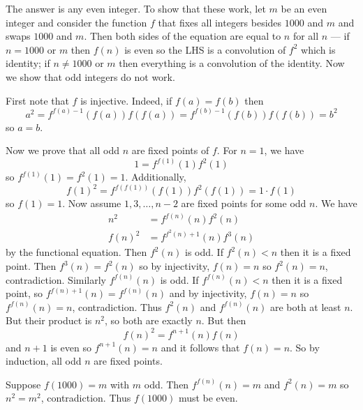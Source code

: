 The answer is any even integer. To show that these work, let $m$ be an even integer and consider the function $f$ that fixes all integers besides $1000$ and $m$ and swaps $1000$ and $m$. Then both sides of the equation are equal to $n$ for all $n$ --- if $n=1000$ or $m$ then $f(n)$ is even so the LHS is a convolution of $f^2$ which is identity; if $n\neq1000$ or $m$ then everything is a convolution of the identity. Now we show that odd integers do not work.

First note that $f$ is injective. Indeed, if $f(a)=f(b)$ then \[a^2=f^{f(a)-1}(f(a))f(f(a))=f^{f(b)-1}(f(b))f(f(b))=b^2\] so $a=b$.

Now we prove that all odd $n$ are fixed points of $f$. For $n=1$, we have \[1=f^{f(1)}(1)f^2(1)\] so $f^{f(1)}(1)=f^2(1)=1$. Additionally, \[f(1)^2=f^{f(f(1))}(f(1))f^2(f(1))=1\cdot f(1)\] so $f(1)=1$. Now assume $1,3,\ldots,n-2$ are fixed points for some odd $n$. We have
\begin{align*}
	n^2&=f^{f(n)}(n)f^2(n)\\
	f(n)^2&=f^{f^2(n)+1}(n)f^3(n)
\end{align*}
by the functional equation. Then $f^2(n)$ is odd. If $f^2(n)<n$ then it is a fixed point. Then $f^3(n)=f^2(n)$ so by injectivity, $f(n)=n$ so $f^2(n)=n$, contradiction. Similarly $f^{f(n)}(n)$ is odd. If $f^{f(n)}(n)<n$ then it is a fixed point, so $f^{f(n)+1}(n)=f^{f(n)}(n)$ and by injectivity, $f(n)=n$ so $f^{f(n)}(n)=n$, contradiction. Thus $f^2(n)$ and $f^{f(n)}(n)$ are both at least $n$. But their product is $n^2$, so both are exactly $n$. But then \[f(n)^2=f^{n+1}(n)f(n)\] and $n+1$ is even so $f^{n+1}(n)=n$ and it follows that $f(n)=n$. So by induction, all odd $n$ are fixed points.

Suppose $f(1000)=m$ with $m$ odd. Then $f^{f(n)}(n)=m$ and $f^2(n)=m$ so $n^2=m^2$, contradiction. Thus $f(1000)$ must be even.